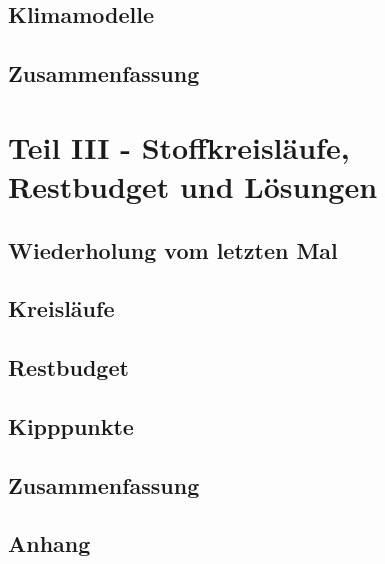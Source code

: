 	\subsection{Klimamodelle}
	
	\subsection{Zusammenfassung}
	
	\section{Teil III - Stoffkreisläufe, Restbudget und Lösungen}
	\subsection{Wiederholung vom letzten Mal}
	
	
	
	\subsection{Kreisläufe}
	
	
	\subsection{Restbudget}
	
	\subsection{Kipppunkte}
	
	\subsection{Zusammenfassung}
	
	
	\subsection{Anhang}
	


